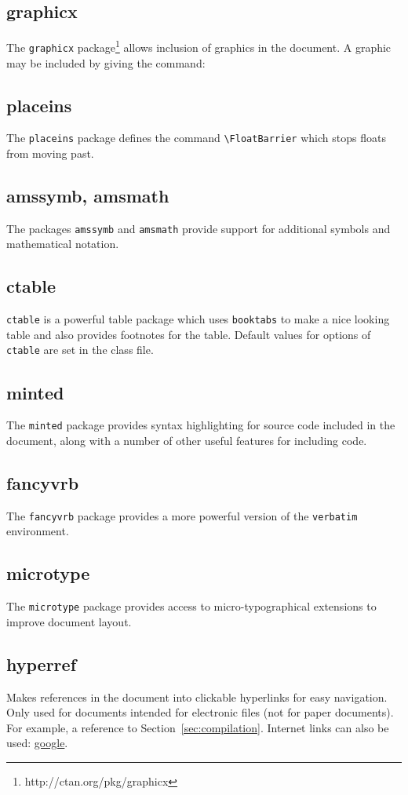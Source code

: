 \documentclass[electronic]{adharticle} %
\begin{document}
\subsection{graphicx}

The \texttt{graphicx} package\footnote{http://ctan.org/pkg/graphicx} allows
inclusion of graphics in the document. A graphic may be included by giving the
command:

\subsection{placeins}

The \texttt{placeins} package defines the command
\texttt{\textbackslash{}FloatBarrier} which stops floats from moving past.

\subsection{amssymb, amsmath}

The packages \texttt{amssymb} and \texttt{amsmath} provide support for
additional symbols and mathematical notation.


\subsection{ctable}

\texttt{ctable} is a powerful table package which uses \texttt{booktabs} to make
a nice looking table and also provides footnotes for the table. Default values
for options of \texttt{ctable} are set in the class file.

\subsection{minted}

The \texttt{minted} package provides syntax highlighting for source code
included in the document, along with a number of other useful features for
including code.

\subsection{fancyvrb}

The \texttt{fancyvrb} package provides a more powerful version of the
\texttt{verbatim} environment.

\subsection{microtype}

The \texttt{microtype} package provides access to micro-typographical extensions
to improve document layout.

\subsection{hyperref}

Makes references in the document into clickable hyperlinks for easy
navigation. Only used for documents intended for electronic files (not for paper
documents). For example, a reference to Section~\ref{sec:compilation}. Internet
links can also be used: \href{http://www.google.co.uk}{google}.
\end{document}
